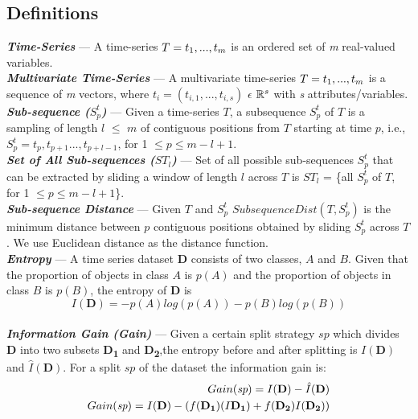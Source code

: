 \documentclass[conference]{IEEEtran}  %
\begin{document}
\subsection{Definitions}
\textbf{\textit{Time-Series}} --- A time-series $T = t\textsubscript{1},..., t_m$ is an ordered set of \textit{m} real-valued variables.
\smallskip\\
\textbf{\textit{Multivariate Time-Series}} --- A multivariate time-series $T = t\textsubscript{1}, . . . , t_m$ is a sequence of \textit{m} vectors, where $t_i = (t_{i,1}, . . . , t_{i,s})$ $\epsilon$ $\mathbb{R}\textsuperscript{\(s\)}$ with \textit{s} attributes/variables.
\smallskip\\
\textbf{\textit{Sub-sequence ($S^t_p$)}} --- Given a time-series $T$, a subsequence $S^t_p$ of $T$ is a sampling of length $l$ \(\leq\) $m$ of contiguous positions from $T$ starting at time $p$, i.e., $S^t_p = t_p, t_{p+1}...,t_{p+l-1}$, for 1 \(\leq p \leq m - l + 1\).
\smallskip\\
\textbf{\textit{Set of All Sub-sequences ($ST_l$)}} --- Set of all possible sub-sequences $S^t_p$ that can be extracted by sliding a window of length $l$ across $T$ is $ST_l$ = \{all $S^t_p$ of $T$,  for 1 \(\leq p \leq m - l + 1\)\}.
\smallskip\\
\textbf{\textit{Sub-sequence Distance}} --- Given $T$ and $S^t_p$ \(SubsequenceDist(T,S^t_p)\) is the minimum distance between $p$ contiguous positions obtained by sliding $S^t_p$ across $T$. We use Euclidean distance as the distance function.
\smallskip\\
\textbf{\textit{Entropy}} --- A time series dataset \textbf{D} consists of two classes, $A$ and $B$. Given that the proportion of objects in class $A$ is $p(A)$ and the proportion of objects in class $B$ is $p(B)$, the entropy of \textbf{D} is
\begin{equation}
 I(\textbf{D}) = -p(A)log(p(A))  - p(B)log(p(B))
 \label{eq:id}
\end{equation}
\smallskip\\
\textbf{\textit{Information Gain (Gain)}} --- Given a certain split strategy $sp$ which divides \textbf{D} into two subsets \textbf{D\textsubscript{1}} and \textbf{D\textsubscript{2}},the entropy before and after splitting is $I(\textbf{D})$ and $\hat{I}(\textbf{D})$. For a split $sp$ of the dataset the information gain is:
\begin{equation}
\begin{split}
Gain(\textit{sp}) = I(\textbf{D}) - \hat{I}(\textbf{D})\\
Gain(\textit{sp}) = I(\textbf{D}) - (f(\textbf{D\textsubscript{1}})(I\textbf{D\textsubscript{1}})+f(\textbf{D\textsubscript{2}})I(\textbf{D\textsubscript{2}}))
\end{split}
\label{eq:gain}
\end{equation}
\end{document}
